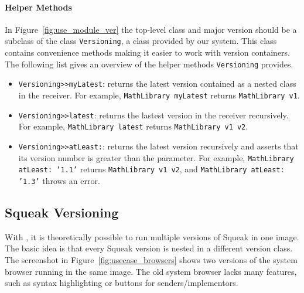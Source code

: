 \paragraph{Helper Methods}
In Figure~\ref{fig:use_module_ver} the top-level class and major version should be a subclass of the class \texttt{Versioning}, a class provided by our system. This class contains convenience methods making it easier to work with version containers. The following list gives an overview of the helper methods \texttt{Versioning} provides.

\begin{itemize}
	\item \texttt{Versioning>>myLatest}: returns the latest version contained as a nested class in the receiver. For example, \texttt{MathLibrary myLatest} returns \texttt{MathLibrary v1}.
	\item \texttt{Versioning>>latest}: returns the lastest version in the receiver recursively. For example, \texttt{MathLibrary latest} returns \texttt{MathLibrary v1 v2}.
	\item \texttt{Versioning>>atLeast:}: returns the latest version recursively and asserts that its version number is greater than the parameter. For example, \texttt{MathLibrary atLeast: '1.1'} returns \texttt{MathLibrary v1 v2}, and \texttt{MathLibrary atLeast: '1.3'} throws an error.
\end{itemize}

\subsection{Squeak Versioning}
With \msname, it is theoretically possible to run multiple versions of Squeak in one image. The basic idea is that every Squeak version is nested in a different version class. The screenshot in Figure~\ref{fig:usecase_browsers} shows two versions of the system browser running in the same image. The old system browser lacks many features, such as syntax highlighting or buttons for senders/implementors.

